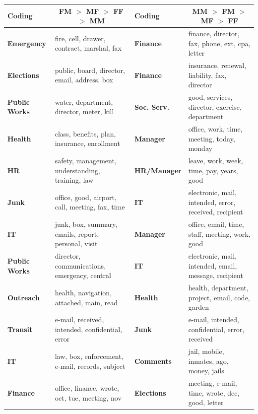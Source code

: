 \documentclass{pnastwo}
\begin{document}
\begin{article}
	
	\vspace*{-.4in}
\begin{table}
	\hspace*{-.7in}
	\begin{tabular}{lm{}|lm{}}
		\toprule
		Coding & \multicolumn{1}{c}{FM $>$  MF $>$ FF $>$ MM} & Coding &  \multicolumn{1}{c}{MM $>$ FM $>$ MF $>$ FF}\\
		\midrule
\textbf{Emergency} & fire, cell, drawer, contract, marshal, fax
 &
\textbf{Finance} & finance, director, fax, phone, ext, cpa, letter\\ 
\textbf{Elections} & public, board, director, email, address, box
 &
\textbf{Finance} & insurance, renewal, liability, fax, director\\ 
\textbf{Public Works} & water, department, director, meter, kill
 &
\textbf{Soc. Serv.} & good, services, director, exercise, department\\ 
\textbf{Health } & class, benefits, plan, insurance, enrollment
 &
\textbf{Manager} & office, work, time, meeting, today, monday\\ 
\textbf{HR} & safety, management, understanding, training, law
 &
\textbf{HR/Manager} & leave, work, week, time, pay, years, good\\ 
\textbf{Junk} & office, good, airport, call, meeting, fax, time
 &
\textbf{IT} & electronic, mail, intended, error, received, recipient\\ 
\textbf{IT } & junk, box, summary, emails, report, personal, visit
 &
\textbf{Manager} & office, email, time, staff, meeting, work, good\\ 
\textbf{Public Works} & director, communications, emergency, central
 &
\textbf{IT} & electronic, mail, intended, email, message, recipient\\ 
\textbf{Outreach} & health, navigation, attached, main, read
 &
\textbf{Health} & health, department, project, email, code, garden\\ 
\textbf{Transit} & e-mail, received, intended, confidential, error
 &
\textbf{Junk } & e-mail, intended, confidential, error, received\\ 
\textbf{IT } & law, box, enforcement, e-mail, records, subject
 &
\textbf{Comments} & jail, mobile, inmates, ago, money, jails\\ 
\textbf{Finance} & office, finance, wrote, oct, tue, meeting, nov
 &
\textbf{Elections} & meeting, e-mail, time, wrote, dec, good, letter\\ 

\end{tabular}
\end{table}
\end{article}
\end{document}
